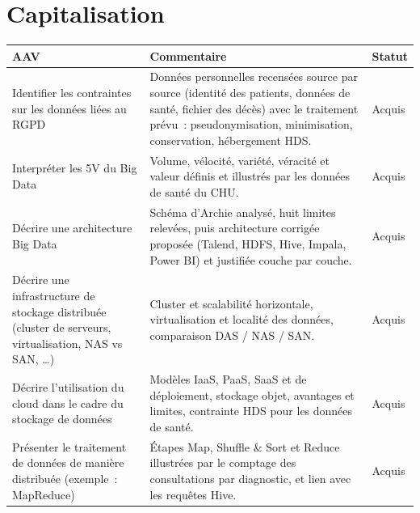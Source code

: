 \newpage
\section*{Capitalisation}
{}

\begin{center}
\small
\setlength{\tabcolsep}{8pt}
\renewcommand{\arraystretch}{1.15}

\begin{tabular}{|>{\raggedright\arraybackslash}p{}|>{\raggedright\arraybackslash}p{}|m{}|}
\hline
\textbf{AAV} & \textbf{Commentaire} & \textbf{Statut} \\ \hline

Identifier les contraintes sur les données liées au RGPD &
Données personnelles recensées source par source (identité des patients, données de santé, fichier des décès) avec le traitement prévu~: pseudonymisation, minimisation, conservation, hébergement HDS. &
{\color{green!60!black}Acquis} \\ \hline

Interpréter les 5V du Big Data &
Volume, vélocité, variété, véracité et valeur définis et illustrés par les données de santé du CHU. &
{\color{green!60!black}Acquis} \\ \hline

Décrire une architecture Big Data &
Schéma d'Archie analysé, huit limites relevées, puis architecture corrigée proposée (Talend, HDFS, Hive, Impala, Power BI) et justifiée couche par couche. &
{\color{green!60!black}Acquis} \\ \hline

Décrire une infrastructure de stockage distribuée (cluster de serveurs, virtualisation, NAS vs SAN, \dots) &
Cluster et scalabilité horizontale, virtualisation et localité des données, comparaison DAS / NAS / SAN. &
{\color{green!60!black}Acquis} \\ \hline

Décrire l'utilisation du cloud dans le cadre du stockage de données &
Modèles IaaS, PaaS, SaaS et de déploiement, stockage objet, avantages et limites, contrainte HDS pour les données de santé. &
{\color{green!60!black}Acquis} \\ \hline

Présenter le traitement de données de manière distribuée (exemple~: MapReduce) &
Étapes Map, Shuffle \& Sort et Reduce illustrées par le comptage des consultations par diagnostic, et lien avec les requêtes Hive. &
{\color{green!60!black}Acquis} \\ \hline


\end{tabular}
\end{center}
